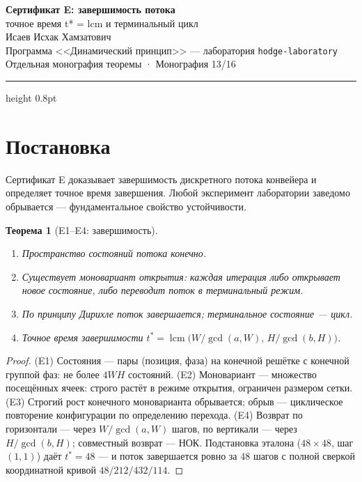 \documentclass[11pt,a4paper]{article}
\theoremstyle{plain}
\newtheorem{theorem}{Теорема}
\theoremstyle{definition}
\theoremstyle{remark}
\newcommand{\lcm}{\operatorname{lcm}}
\begin{document}
\begin{center}
{\LARGE\bfseries Сертификат E: завершимость потока}\\[0.4em]
{\large точное время t* = lcm и терминальный цикл}\\[0.6em]
{\normalsize Исаев Исхак Хамзатович}\\[0.2em]
{\small Программа <<Динамический принцип>> --- лаборатория \texttt{hodge-laboratory}}\\[0.15em]
{\small Отдельная монография теоремы · Монография 13/16}
\end{center}
\vspace{0.4em}
{\color{linkblue}\hrule height 0.8pt}
\vspace{0.8em}

\section{Постановка}

Сертификат E доказывает завершимость дискретного потока конвейера и
определяет точное время завершения. Любой эксперимент лаборатории
заведомо обрывается --- фундаментальное свойство устойчивости.

\begin{theorem}[E1--E4: завершимость]\label{th:Estand}
\begin{enumerate}[leftmargin=2em]
\item[(E1)] Пространство состояний потока конечно.
\item[(E2)] Существует моновариант открытия: каждая итерация либо
открывает новое состояние, либо переводит поток в терминальный
режим.
\item[(E3)] По принципу Дирихле поток завершается; терминальное
состояние --- цикл.
\item[(E4)] Точное время завершимости
$t^*=\lcm\bigl(W/\gcd(a,W),\,H/\gcd(b,H)\bigr)$.
\end{enumerate}
\end{theorem}

\begin{proof}
(E1) Состояния --- пары (позиция, фаза) на конечной решётке с
конечной группой фаз: не более $4WH$ состояний.
(E2) Моновариант --- множество посещённых ячеек: строго растёт в
режиме открытия, ограничен размером сетки.
(E3) Строгий рост конечного моноварианта обрывается; обрыв ---
циклическое повторение конфигурации по определению перехода.
(E4) Возврат по горизонтали --- через $W/\gcd(a,W)$ шагов, по
вертикали --- через $H/\gcd(b,H)$; совместный возврат --- НОК.
Подстановка эталона ($48\times48$, шаг $(1,1)$) даёт $t^*=48$ ---
и поток завершается ровно за $48$ шагов с полной сверкой
координатной кривой $48/212/432/114$.
\end{proof}
\end{document}
